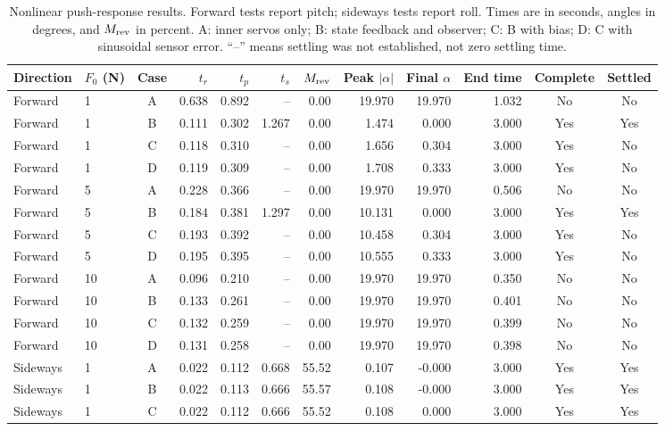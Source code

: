 \documentclass[conference,a4paper]{IEEEtran}
\begin{document}
\begin{table}[!t]
\centering\footnotesize
\caption{Nonlinear push-response results. Forward tests report pitch; sideways tests report roll. Times are in seconds, angles in degrees, and $M_{\rm rev}$ in percent. A: inner servos only; B: state feedback and observer; C: B with bias; D: C with sinusoidal sensor error. ``--'' means settling was not established, not zero settling time.}
\label{tab:push_nonlinear}
\setlength{\tabcolsep}{5pt}
\begin{tabular}{@{}llcrrrrrrrcc@{}}
\toprule
Direction & $F_0$ (N) & Case & $t_r$ & $t_p$ & $t_s$ & $M_{\rm rev}$ & Peak $|\alpha|$ & Final $\alpha$ & End time & Complete & Settled\\
\midrule
Forward & 1 & A & 0.638 & 0.892 & -- & 0.00 & 19.970 & 19.970 & 1.032 & No & No\\
Forward & 1 & B & 0.111 & 0.302 & 1.267 & 0.00 & 1.474 & 0.000 & 3.000 & Yes & Yes\\
Forward & 1 & C & 0.118 & 0.310 & -- & 0.00 & 1.656 & 0.304 & 3.000 & Yes & No\\
Forward & 1 & D & 0.119 & 0.309 & -- & 0.00 & 1.708 & 0.333 & 3.000 & Yes & No\\
\midrule
Forward & 5 & A & 0.228 & 0.366 & -- & 0.00 & 19.970 & 19.970 & 0.506 & No & No\\
Forward & 5 & B & 0.184 & 0.381 & 1.297 & 0.00 & 10.131 & 0.000 & 3.000 & Yes & Yes\\
Forward & 5 & C & 0.193 & 0.392 & -- & 0.00 & 10.458 & 0.304 & 3.000 & Yes & No\\
Forward & 5 & D & 0.195 & 0.395 & -- & 0.00 & 10.555 & 0.333 & 3.000 & Yes & No\\
\midrule
Forward & 10 & A & 0.096 & 0.210 & -- & 0.00 & 19.970 & 19.970 & 0.350 & No & No\\
Forward & 10 & B & 0.133 & 0.261 & -- & 0.00 & 19.970 & 19.970 & 0.401 & No & No\\
Forward & 10 & C & 0.132 & 0.259 & -- & 0.00 & 19.970 & 19.970 & 0.399 & No & No\\
Forward & 10 & D & 0.131 & 0.258 & -- & 0.00 & 19.970 & 19.970 & 0.398 & No & No\\
\midrule
Sideways & 1 & A & 0.022 & 0.112 & 0.668 & 55.52 & 0.107 & -0.000 & 3.000 & Yes & Yes\\
Sideways & 1 & B & 0.022 & 0.113 & 0.666 & 55.57 & 0.108 & -0.000 & 3.000 & Yes & Yes\\
Sideways & 1 & C & 0.022 & 0.112 & 0.666 & 55.52 & 0.108 & 0.000 & 3.000 & Yes & Yes\\

\end{tabular}
\end{table}
\end{document}
